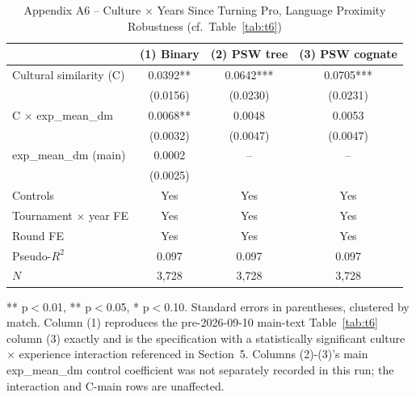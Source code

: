 \documentclass[10pt]{article}
\begin{document}
\begin{table}[htbp]
\centering
\caption{Appendix A6 -- Culture $\times$ Years Since Turning Pro, Language Proximity Robustness (cf.\ Table~\ref{tab:t6}) \label{tab:a6}}
\begin{threeparttable}
\begin{tabular}{lccc}
\toprule
 & (1) Binary & (2) PSW tree & (3) PSW cognate \\
\midrule
Cultural similarity (C)  & 0.0392** & 0.0642*** & 0.0705*** \\
 & (0.0156) & (0.0230) & (0.0231) \\
C $\times$ exp\_mean\_dm & 0.0068** & 0.0048 & 0.0053 \\
 & (0.0032) & (0.0047) & (0.0047) \\
exp\_mean\_dm (main) & 0.0002 & \multicolumn{1}{c}{--} & \multicolumn{1}{c}{--} \\
 & (0.0025) & & \\
\midrule
Controls & Yes & Yes & Yes \\
Tournament $\times$ year FE & Yes & Yes & Yes \\
Round FE & Yes & Yes & Yes \\
Pseudo-$R^2$ & 0.097 & 0.097 & 0.097 \\
$N$ & 3,728 & 3,728 & 3,728 \\
\bottomrule
\end{tabular}
\begin{tablenotes}
\small
\item *** p$<$0.01, ** p$<$0.05, * p$<$0.10. Standard errors in parentheses, clustered by match. Column (1) reproduces the pre-2026-09-10 main-text Table~\ref{tab:t6} column (3) exactly and is the specification with a statistically significant culture $\times$ experience interaction referenced in Section~5. Columns (2)-(3)'s main exp\_mean\_dm control coefficient was not separately recorded in this run; the interaction and C-main rows are unaffected.
\end{tablenotes}
\end{threeparttable}
\end{table}
\end{document}
